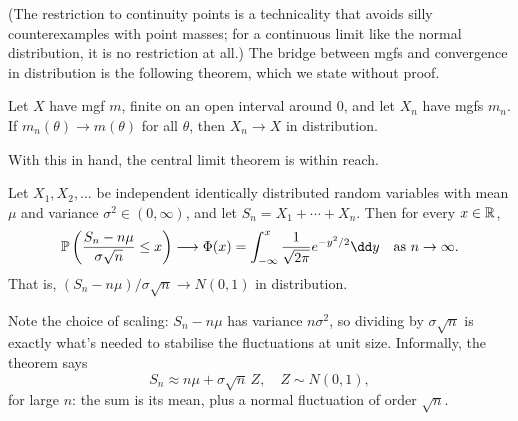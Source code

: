 \documentclass[a4paper]{scrartcl}
\begin{document}
(The restriction to continuity points is a technicality that avoids silly counterexamples with point masses; for a continuous limit like the normal distribution, it is no restriction at all.) The bridge between mgfs and convergence in distribution is the following theorem, which we state without proof.

\begin{theorem}
	Let $X$ have mgf $m$, finite on an open interval around $0$, and let $X_n$ have mgfs $m_n$. If $m_n(\theta) \rightarrow m(\theta)$ for all $\theta$, then $X_n \rightarrow X$ in distribution.
\end{theorem}

With this in hand, the central limit theorem is within reach.

\begin{theorem}
	Let $X_1, X_2, \dots$ be independent identically distributed random variables with mean $\mu$ and variance $\sigma^2 \in (0, \infty)$, and let $S_n = X_1 + \cdots + X_n$. Then for every $x \in \mathbb{R}$,
	$$
	\PP\left(\frac{S_n - n\mu}{\sigma\sqrt{n}} \leq x \right) \longrightarrow \Phi(x) = \int_{-\infty}^{x} \frac{1}{\sqrt{2\pi}}e^{-y^2/2}\dd y \quad \text{as } n \rightarrow \infty.
	$$
	That is, $(S_n - n\mu)/\sigma\sqrt{n} \rightarrow N(0,1)$ in distribution.
\end{theorem}

Note the choice of scaling: $S_n - n\mu$ has variance $n\sigma^2$, so dividing by $\sigma\sqrt{n}$ is exactly what's needed to stabilise the fluctuations at unit size. Informally, the theorem says
$$
S_n \approx n\mu + \sigma\sqrt{n}\, Z, \quad Z \sim N(0, 1),
$$
for large $n$: the sum is its mean, plus a normal fluctuation of order $\sqrt{n}$.
\end{document}
